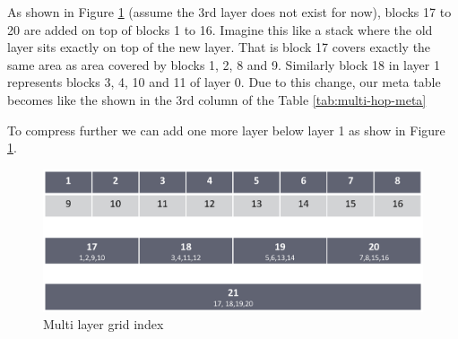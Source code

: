 {As shown in Figure \ref{fig:multi-grid2} (assume the 3rd layer does not exist for now), blocks 17 to 20 are added on top of blocks 1 to 16. Imagine this like a stack where the old layer sits exactly on top of the new layer. That is block 17 covers exactly the same area as area covered by blocks 1, 2, 8 and 9. Similarly block 18 in layer 1 represents blocks 3, 4, 10 and 11 of layer 0. Due to this change, our meta table becomes like the shown in the 3rd column of the Table \ref{tab:multi-hop-meta}


To compress further we can add one more layer below layer 1 as show in Figure \ref{fig:multi-grid2}.

\begin{figure}[t]
    \centering
    \includegraphics[width=0.88\linewidth]{images/multi_layer_grid_index.eps}
    \caption{Multi layer grid index}
    \label{fig:multi-grid2}
\end{figure}

}
